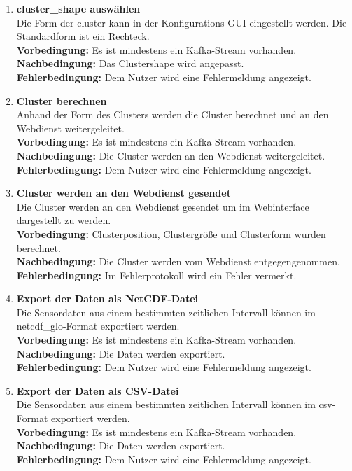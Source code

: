 \begin{enumerate}[label=\textbf{PF\arabic{enumi}0}]
	\item \textbf{\gls{cluster_shape} auswählen}\\
		Die Form der \gls{cluster} kann in der Konfigurations-GUI eingestellt werden. Die Standardform ist ein Rechteck.\\
		\textbf{Vorbedingung:} Es ist mindestens ein Kafka-Stream vorhanden.\\
		\textbf{Nachbedingung:} Das Clustershape wird angepasst.\\
		\textbf{Fehlerbedingung:} Dem Nutzer wird eine Fehlermeldung angezeigt.
		
	\item \textbf{Cluster berechnen} \label{Kachel}\\
		Anhand der Form des Clusters werden die Cluster berechnet und an den Webdienst weitergeleitet.\\
		\textbf{Vorbedingung:} Es ist mindestens ein Kafka-Stream vorhanden.\\
		\textbf{Nachbedingung:} Die Cluster werden an den Webdienst weitergeleitet.\\
		\textbf{Fehlerbedingung:} Dem Nutzer wird eine Fehlermeldung angezeigt.
	
	\item \textbf{Cluster werden an den Webdienst gesendet} \label{send}\\
		Die Cluster werden an den Webdienst gesendet um im Webinterface dargestellt zu werden.\\
		\textbf{Vorbedingung:} Clusterposition, Clustergröße und Clusterform wurden berechnet.\\
		\textbf{Nachbedingung:} Die Cluster werden vom Webdienst entgegengenommen.\\
		\textbf{Fehlerbedingung:} Im Fehlerprotokoll wird ein Fehler vermerkt.
	
	\item \textbf{Export der Daten als NetCDF-Datei} \label{netcdf}\\
		Die Sensordaten aus einem bestimmten zeitlichen Intervall können im \gls{netcdf_glo}-Format exportiert werden.\\
		\textbf{Vorbedingung:} Es ist mindestens ein Kafka-Stream vorhanden.\\
		\textbf{Nachbedingung:} Die Daten werden exportiert.\\
		\textbf{Fehlerbedingung:} Dem Nutzer wird eine Fehlermeldung angezeigt.
	
	\item \textbf{Export der Daten als CSV-Datei} \label{CSV}\\
		Die Sensordaten aus einem bestimmten zeitlichen Intervall können im \gls{csv}-Format exportiert werden.\\
		\textbf{Vorbedingung:} Es ist mindestens ein Kafka-Stream vorhanden.\\
		\textbf{Nachbedingung:} Die Daten werden exportiert.\\
		\textbf{Fehlerbedingung:} Dem Nutzer wird eine Fehlermeldung angezeigt.
		

\end{enumerate}

